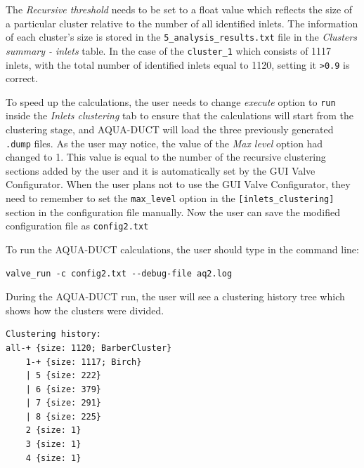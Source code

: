 \documentclass[9pt,tutorial]{livecoms}
\begin{document}
The \emph{Recursive threshold} needs to be set to a float value which reflects the size of a particular cluster relative to the number of all identified inlets. The information of each cluster's size is stored in the \texttt{5\_analysis\_results.txt} file in the \emph{Clusters summary - inlets} table. In the case of the \texttt{cluster\_1} which consists of 1117 inlets, with the total number of identified inlets equal to 1120, setting it \texttt{>0.9} is correct.

To speed up the calculations, the user needs to change \textit{execute} option to \texttt{run} inside the \textit{Inlets clustering} tab to ensure that the calculations will start from the clustering stage, and AQUA-DUCT will load the three previously generated \texttt{.dump} files. As the user may notice, the value of the \emph{Max level} option had changed to 1. This value is equal to the number of the recursive clustering sections added by the user and it is automatically set by the GUI Valve Configurator. When the user plans not to use the GUI Valve Configurator, they need to remember to set the \texttt{max\_level} option in the \texttt{[inlets\_clustering]} section in the configuration file manually. Now the user can save the modified configuration file as \texttt{config2.txt}

To run the AQUA-DUCT calculations, the user should type in the command line:
\begin{lstlisting}[columns=fullflexible]
valve_run -c config2.txt --debug-file aq2.log
\end{lstlisting}

During the AQUA-DUCT run, the user will see a clustering history tree which shows how the clusters were divided.
\begin{lstlisting}
Clustering history:
all-+ {size: 1120; BarberCluster}
    1-+ {size: 1117; Birch}
    | 5 {size: 222}
    | 6 {size: 379}
    | 7 {size: 291}
    | 8 {size: 225}
    2 {size: 1}
    3 {size: 1}
    4 {size: 1}
\end{lstlisting}
\end{document}
